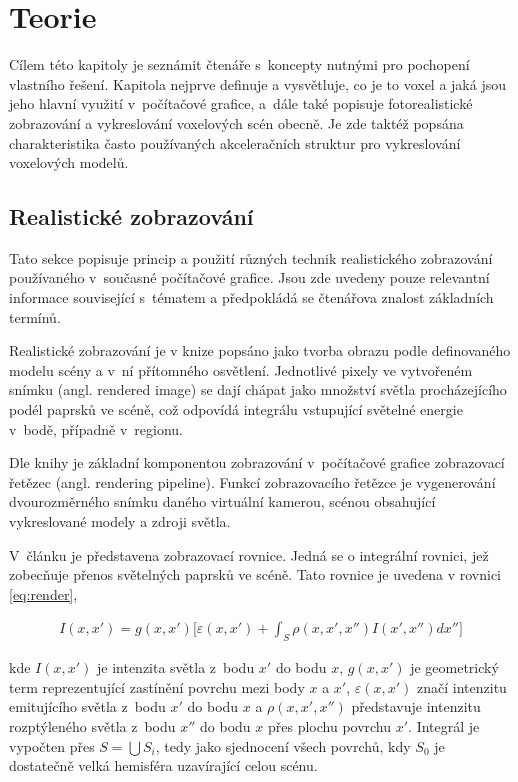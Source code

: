 \chapter{Teorie}
\label{teorie}
Cílem této kapitoly je seznámit čtenáře s~koncepty nutnými pro pochopení vlastního řešení. Kapitola nejprve definuje a vysvětluje, co je to voxel a jaká jsou jeho hlavní využití v~počítačové grafice, a~dále také popisuje fotorealistické zobrazování a vykreslování voxelových scén obecně. Je zde taktéž popsána charakteristika často používaných akceleračních struktur pro vykreslování voxelových modelů.

\section{Realistické zobrazování}
Tato sekce popisuje princip a použití různých technik realistického zobrazování používaného v~současné počítačové grafice. Jsou zde uvedeny pouze relevantní informace související s~tématem a předpokládá se čtenářova znalost základních termínů.

Realistické zobrazování je v knize \cite{gfx_principles_practice} popsáno jako tvorba obrazu podle definovaného modelu scény a v~ní přítomného osvětlení. Jednotlivé pixely ve vytvořeném snímku (angl. rendered image) se dají chápat jako množství světla procházejícího podél paprsků ve scéně, což odpovídá integrálu vstupující světelné energie v~bodě, případně v~regionu.

Dle knihy \cite{real_time_render} je základní komponentou zobrazování v~počítačové grafice zobrazovací řetězec (angl. rendering pipeline). Funkcí zobrazovacího řetězce je vygenerování dvourozměrného snímku daného virtuální kamerou, scénou obsahující vykreslované modely a zdroji světla.

V~článku \cite{render_eq} je představena zobrazovací rovnice. Jedná se o integrální rovnici, jež zobecňuje přenos světelných paprsků ve scéně. Tato rovnice je uvedena v rovnici \ref{eq:render},

\begin{equation} \label{eq:render}
	\begin{gathered}
		I(x, x') = g(x, x') \Big[\varepsilon(x, x') + \int_S\rho(x, x', x'')I(x', x'')dx''\Big]
	\end{gathered}
\end{equation}

kde $I(x, x')$ je intenzita světla z~bodu $x'$ do bodu $x$, $g(x, x')$ je geometrický term reprezentující zastínění povrchu mezi body $x$ a $x'$, $\varepsilon(x, x')$ značí intenzitu emitujícího světla z~bodu $x'$ do bodu $x$ a $\rho(x, x', x'')$ představuje intenzitu rozptýleného světla z~bodu $x''$ do bodu $x$ přes plochu povrchu $x'$. Integrál je vypočten přes $S = \bigcup S_i$, tedy jako sjednocení všech povrchů, kdy $S_0$ je dostatečně velká hemisféra uzavírající celou scénu.

